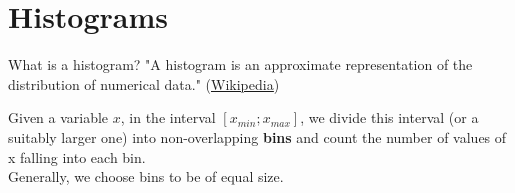 \documentclass[9pt, aspectratio=169]{beamer}
\begin{document}
\begin{frame}
\begin{columns}
\begin{column}{0.2\textwidth}
        \end{column}
    \end{columns}
\end{frame}

\section{Histograms}

\begin{frame}
    {What is a histogram?}
    "A histogram is an approximate representation of the distribution of numerical data." (\href{https://en.wikipedia.org/wiki/Histogram}{\small{\underline{Wikipedia}}})

    Given a variable $x$, in the interval $[x_{min}; x_{max}]$, we divide this interval (or a suitably larger one) into non-overlapping \textbf{bins} and count the number of values of x falling into each bin.\\
    Generally, we choose bins to be of equal size.
\end{frame}
\end{document}
